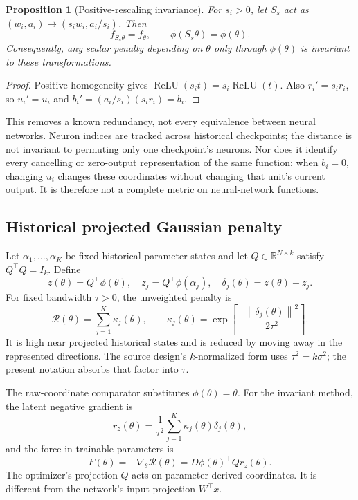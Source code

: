 \documentclass[11pt,letterpaper]{article}
\newtheorem{proposition}{Proposition}
\theoremstyle{remark}\newtheorem{remark}{Remark}
\newcommand{\R}{\mathbb R}
\newcommand{\relu}{\operatorname{ReLU}}
\newcommand{\norm}[1]{\left\lVert#1\right\rVert}
\begin{document}
\begin{proposition}[Positive-rescaling invariance]\label{prop:invariance}
For $s_i>0$, let $S_s$ act as $(w_i,a_i)\mapsto(s_iw_i,a_i/s_i)$. Then
\begin{equation}
f_{S_s\theta}=f_\theta,\qquad \phi(S_s\theta)=\phi(\theta).
\end{equation}
Consequently, any scalar penalty depending on $\theta$ only through $\phi(\theta)$ is invariant to these transformations.
\end{proposition}
\begin{proof}
Positive homogeneity gives $\relu(s_it)=s_i\relu(t)$. Also $r_i'=s_ir_i$, so $u_i'=u_i$ and $b_i'=(a_i/s_i)(s_ir_i)=b_i$.
\end{proof}
This removes a known redundancy, not every equivalence between neural networks. Neuron indices are tracked across historical checkpoints; the distance is not invariant to permuting only one checkpoint's neurons. Nor does it identify every cancelling or zero-output representation of the same function: when $b_i=0$, changing $u_i$ changes these coordinates without changing that unit's current output. It is therefore not a complete metric on neural-network functions.

\subsection{Historical projected Gaussian penalty}
Let $\alpha_1,\ldots,\alpha_K$ be fixed historical parameter states and let
$Q\in\R^{N\times k}$ satisfy $Q^\top Q=I_k$. Define
\begin{equation}\label{eq:project}
z(\theta)=Q^\top\phi(\theta),\quad z_j=Q^\top\phi(\alpha_j),\quad
\delta_j(\theta)=z(\theta)-z_j.
\end{equation}
For fixed bandwidth $\tau>0$, the unweighted penalty is
\begin{equation}\label{eq:penalty}
\mathcal R(\theta)=\sum_{j=1}^{K}\kappa_j(\theta),\qquad
\kappa_j(\theta)=\exp\left[-\frac{\norm{\delta_j(\theta)}^2}{2\tau^2}\right].
\end{equation}
It is high near projected historical states and is reduced by moving away in the represented directions. The source design's $k$-normalized form uses $\tau^2=k\sigma^2$; the present notation absorbs that factor into $\tau$.

The raw-coordinate comparator substitutes $\phi(\theta)=\theta$. For the invariant method, the latent negative gradient is
\begin{equation}\label{eq:latentforce}
r_z(\theta)=\frac{1}{\tau^2}\sum_{j=1}^{K}\kappa_j(\theta)\delta_j(\theta),
\end{equation}
and the force in trainable parameters is
\begin{equation}\label{eq:force}
F(\theta)=-\nabla_\theta\mathcal R(\theta)
=D\phi(\theta)^\top Qr_z(\theta).
\end{equation}
The optimizer's projection $Q$ acts on parameter-derived coordinates. It is different from the network's input projection $W^\top x$.
\end{document}
